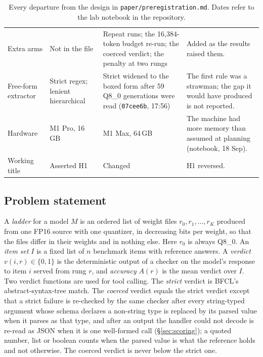 \documentclass[12pt,letterpaper]{article}
\newcommand{\bfcl}{BFCL}
\begin{document}
\begin{table}[p]
\begin{tabular}{@{}p{2.6cm}p{4.2cm}p{4.6cm}p{4.6cm}@{}}
Extra arms & Not in the file & Repeat runs; the 16{,}384-token budget re-run; the coerced verdict; the penalty at two rungs & Added as the results raised them. \\
Free-form extractor & Strict regex; lenient hierarchical & Strict widened to the boxed form after 59 Q8\_0 generations were read (\texttt{07cee6b}, 17:56) & The first rule was a strawman; the gap it would have produced is not reported. \\
Hardware & M1 Pro, 16\,GB & M1 Max, 64\,GB & The machine had more memory than assumed at planning (notebook, 18 Sep). \\
Working title & Asserted H1 & Changed & H1 reversed. \\
\bottomrule
\end{tabular}
\caption{Every departure from the design in \texttt{paper/preregistration.md}. Dates refer to the lab notebook in the repository.}
\label{tab:deviations}
\end{table}

\subsection{Problem statement}
\label{sec:problem}
A \emph{ladder} for a model $M$ is an ordered list of weight files $r_0, r_1, \dots, r_K$ produced from one FP16 source with one quantizer, in decreasing bits per weight, so that the files differ in their weights and in nothing else. Here $r_0$ is always Q8\_0. An \emph{item set} $I$ is a fixed list of $n$ benchmark items with reference answers. A \emph{verdict} $v(i, r) \in \{0, 1\}$ is the deterministic output of a checker on the model's response to item $i$ served from rung $r$, and \emph{accuracy} $A(r)$ is the mean verdict over $I$. Two verdict functions are used for tool calling. The \emph{strict} verdict is \bfcl{}'s abstract-syntax-tree match. The \emph{coerced} verdict equals the strict verdict except that a strict failure is re-checked by the same checker after every string-typed argument whose schema declares a non-string type is replaced by its parsed value when it parses as that type, and after an output the handler could not decode is re-read as JSON when it is one well-formed call (\S\ref{sec:scoring}); a quoted number, list or boolean counts when the parsed value is what the reference holds and not otherwise. The coerced verdict is never below the strict one.
\end{document}
